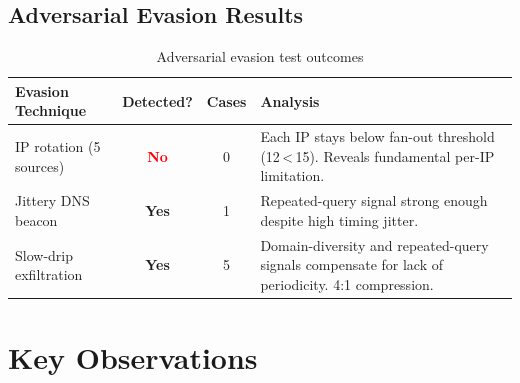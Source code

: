 \documentclass[11pt, a4paper]{article}
\begin{document}
\subsection{Adversarial Evasion Results}

\begin{table}[H]
\centering\small
\caption{Adversarial evasion test outcomes}
\label{tab:evasion}
\begin{tabularx}{\textwidth}{@{} l c c L{5.8cm} @{}}
\toprule
\textbf{Evasion Technique} & \textbf{Detected?} & \textbf{Cases} & \textbf{Analysis} \\
\midrule
IP rotation (5 sources)   & \textcolor{red}{\textbf{No}}  & 0 & Each IP stays below fan-out threshold (12\,<\,15). Reveals fundamental per-IP limitation. \\
Jittery DNS beacon        & \textcolor{green!50!black}{\textbf{Yes}} & 1 & Repeated-query signal strong enough despite high timing jitter. \\
Slow-drip exfiltration    & \textcolor{green!50!black}{\textbf{Yes}} & 5 & Domain-diversity and repeated-query signals compensate for lack of periodicity. 4:1 compression. \\
\bottomrule
\end{tabularx}
\end{table}

\section{Key Observations}
\end{document}
